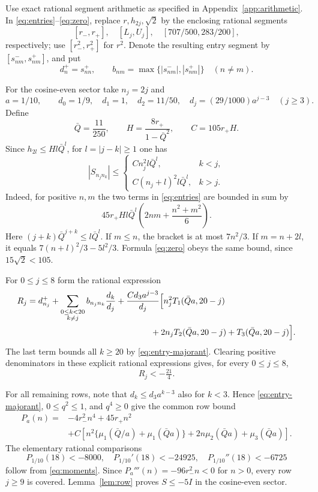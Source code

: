 Use exact rational segment arithmetic as specified in Appendix~\ref{app:arithmetic}. In \eqref{eq:entries}--\eqref{eq:zero}, replace $r,h_{2j},\sqrt2$ by the enclosing rational segments
\[
 [r_-,r_+],\quad[L_j,U_j],\quad[707/500,283/200],
\]
respectively; use $[r_-^2,r_+^2]$ for $r^2$. Denote the resulting entry segment by $[s^-_{nm},s^+_{nm}]$, and put
\[
 d^+_n=s^+_{nn},\qquad b_{nm}=\max\{|s^-_{nm}|,|s^+_{nm}|\}\quad(n\ne m).
\]

For the cosine-even sector take $n_j=2j$ and
\[
 a=1/10,\qquad d_0=1/9,\quad d_1=1,\quad d_2=11/50,\quad
 d_j=(29/1000)a^{j-3}\quad(j\ge3).
\]
Define
\begin{equation}\label{eq:constants}
 \bar Q=\frac{11}{250},\qquad H=\frac{8r_+}{1-\bar Q^2},\qquad C=105r_+H.
\end{equation}
Since $h_{2l}\le Hl\bar Q^l$, for $l=|j-k|\ge1$ one has
\begin{equation}\label{eq:entry-majorant}
 |S_{n_jn_k}|\le
 \begin{cases}C n_j^2l\bar Q^l,&k<j,\\
 C(n_j+l)^2l\bar Q^l,&k>j.
 \end{cases}
\end{equation}
Indeed, for positive $n,m$ the two terms in \eqref{eq:entries} are bounded in sum by
\[
 45r_+Hl\bar Q^l\left(2nm+\frac{n^2+m^2}{6}\right).
\]
Here $(j+k)\bar Q^{j+k}\le l\bar Q^l$. If $m\le n$, the bracket is at most $7n^2/3$. If $m=n+2l$, it equals $7(n+l)^2/3-5l^2/3$. Formula \eqref{eq:zero} obeys the same bound, since $15\sqrt2<105$.

For $0\le j\le8$ form the rational expression
\begin{align}
 R_j={}&d^+_{n_j}+\sum_{\substack{0\le k<20\\k\ne j}}b_{n_jn_k}\frac{d_k}{d_j}
 +\frac{Cd_3a^{j-3}}{d_j}\Big[
 n_j^2T_1(\bar Qa,20-j)\nonumber\\
 &\hspace{47mm}+2n_jT_2(\bar Qa,20-j)+T_3(\bar Qa,20-j)\Big].\label{eq:finite-rational-row}
\end{align}
The last term bounds all $k\ge20$ by \eqref{eq:entry-majorant}. Clearing positive denominators in these explicit rational expressions gives, for every $0\le j\le8$,
\begin{equation}\label{eq:single-uniform}
 R_j<-\tfrac{21}{4}.
\end{equation}

For all remaining rows, note that $d_k\le d_3a^{k-3}$ also for $k<3$. Hence \eqref{eq:entry-majorant}, $0\le q^2\le1$, and $q^4\ge0$ give the common row bound
\begin{align}
 P_a(n)={}&-4r_-^2n^4+45r_+n^2\nonumber\\
 &+C\left[n^2\{\mu_1(\bar Q/a)+\mu_1(\bar Qa)\}
 +2n\mu_2(\bar Qa)+\mu_3(\bar Qa)\right].\label{eq:tail-P}
\end{align}
The elementary rational comparisons
\[
 P_{1/10}(18)<-8000,\quad P_{1/10}'(18)<-24925,\quad
 P_{1/10}''(18)<-6725
\]
follow from \eqref{eq:moments}. Since $P_a'''(n)=-96r_-^2n<0$ for $n>0$, every row $j\ge9$ is covered. Lemma~\ref{lem:row} proves $S\le-5I$ in the cosine-even sector.

